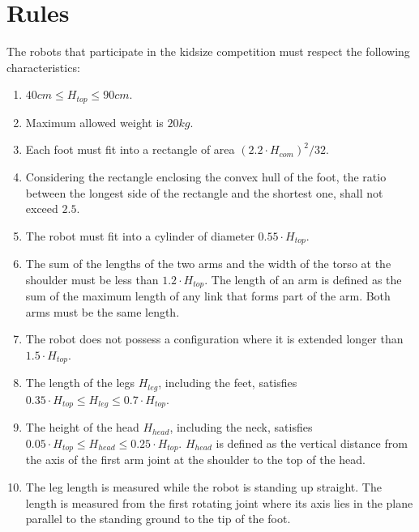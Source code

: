 \chapter{Rules \label{appendix:rules}}
The robots that participate in the kidsize competition must respect the following characteristics\cite{robocup_rules}:\begin{enumerate}
\item $40cm \leq H_{top} \leq 90cm$.

\item Maximum allowed weight is $20kg$.

\item Each foot must fit into a rectangle of area
$(2.2 \cdot H_{com})^2/32$.

\item Considering the rectangle enclosing the convex hull of the foot, the ratio between the longest side of the rectangle and the shortest one, shall not exceed $2.5$.

\item The robot must fit into a cylinder of diameter $0.55 \cdot H_{top}$.

\item The sum of the lengths of the two arms and the width of the torso at the shoulder must be less than $1.2\cdot H_{top}$. The length of an arm is defined as the sum of the maximum length of any link that forms part of the arm. Both arms must be the same length.

\item The robot does not possess a configuration where it is extended longer than $1.5 \cdot H_{top}$.

\item The length of the legs $H_{leg}$, including the feet, satisfies $0.35 \cdot H_{top} \leq H_{leg} \leq 0.7 \cdot H_{top}$.

\item The height of the head $H_{head}$, including the neck, satisfies $0.05 \cdot H_{top} \leq H_{head} \leq 0.25 \cdot H_{top}$. $H_{head}$ is defined as the vertical distance from the axis of the first arm
joint at the shoulder to the top of the head.

\item The leg length is measured while the robot is standing up straight. The length is measured from the first rotating joint where its axis lies in the plane parallel to the standing ground to the tip of the foot.
\end{enumerate}

